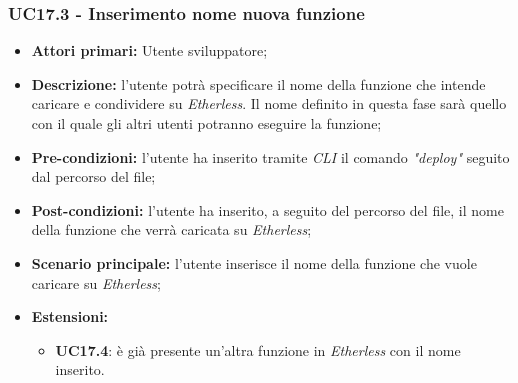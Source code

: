 \subsubsection{UC17.3 - Inserimento nome nuova funzione}
\begin{itemize}
	\item \textbf{Attori primari:} Utente sviluppatore;
	\item \textbf{Descrizione:} l'utente potrà specificare il nome della funzione che intende caricare e condividere su \textit{Etherless}. Il nome definito in questa fase sarà quello con il quale gli altri utenti potranno eseguire la funzione; 
	\item \textbf{Pre-condizioni:} l'utente ha inserito tramite \textit{CLI\glo} il comando \textit{"deploy\glos"} seguito dal percorso del file;
	\item \textbf{Post-condizioni:} l'utente ha inserito, a seguito del percorso del file, il nome della funzione che verrà caricata su \textit{Etherless};
	\item \textbf{Scenario principale:} l'utente inserisce il nome della funzione che vuole caricare su \textit{Etherless};
	\item \textbf{Estensioni:} 
	\begin{itemize}
		\item \textbf{UC17.4}: è già presente un'altra funzione in \textit{Etherless} con il nome inserito.
	\end{itemize}
\end{itemize}